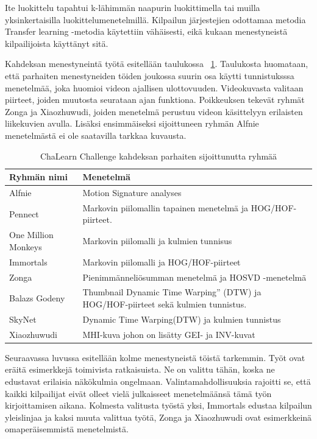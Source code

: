 Ite luokittelu tapahtui k-lähimmän naapurin luokittimella tai muilla yksinkertaisilla luokittelumenetelmillä. 
Kilpailun järjestejien odottamaa metodia Transfer learning -metodia käytettiin vähäisesti, eikä kukaan menestyneistä kilpailijoista käyttänyt sitä. \\
\citep {6239178} 

Kahdeksan menestyneintä työtä esitellään taulukossa ~\ref{table:dvbt_param}. Taulukosta huomataan, että parhaiten menestyneiden töiden
joukossa suurin osa käytti tunnistuksssa menetelmää, joka huomioi videon ajallisen ulottovuuden. Videokuvasta valitaan piirteet, joiden
muutosta seurataan ajan funktiona. Poikkeuksen tekevät ryhmät Zonga ja Xiaozhuwudi, joiden menetelmä perustuu videon käsittelyyn erilaisten liikekuvien avulla.
Lisäksi ensimmäiseksi sijoittuneen ryhmän Alfnie menetelmästä ei ole saatavilla tarkkaa kuvausta. 

\begin{table}[th]
\caption{ChaLearn Challenge kahdeksan parhaiten sijoittunutta ryhmää}
\label{table:dvbt_param}
\begin{center}
\begin{tabular}{|p{}|p{}|} 
    \hline
Ryhmän nimi & Menetelmä \\
    \hline
    \hline
Alfnie & Motion Signature analyses\\ 
    \hline
Pennect & Markovin piilomallin tapainen menetelmä ja HOG/HOF-piirteet.\\
    \hline
One Million Monkeys & Markovin piilomalli ja kulmien tunnisus\\
    \hline
Immortals & Markovin piilomalli ja HOG/HOF-piirteet\\
    \hline
Zonga & Pienimmänneliösumman menetelmä ja HOSVD -menetelmä\\
    \hline
Balazs Godeny & Thumbnail Dynamic Time Warping” (DTW) ja HOG/HOF-piirteet sekä kulmien tunnistus.\\
    \hline
SkyNet & Dynamic Time Warping(DTW) ja kulmien tunnistus\\
    \hline
Xiaozhuwudi & MHI-kuva johon on lisätty GEI- ja INV-kuvat\\
    \hline	
\end{tabular}
\end{center}
\end{table}

Seuraavassa luvussa esitellään kolme menestyneistä töistä tarkemmin. Työt ovat eräitä esimerkkejä toimivista ratkaisuista. Ne on valittu tähän, 
koska ne edustavat erilaisia näkökulmia ongelmaan. Valintamahdollisuuksia rajoitti se, että kaikki kilpailijat eivät olleet vielä julkaisseet 
menetelmäänsä tämä työn kirjoittamisen aikana. Kolmesta valitusta työstä yksi, Immortals edustaa kilpailun yleislinjaa ja kaksi muuta valittua työtä,
Zonga ja Xiaozhuwudi ovat esimerkkeinä omaperäisemmistä menetelmistä.\\

